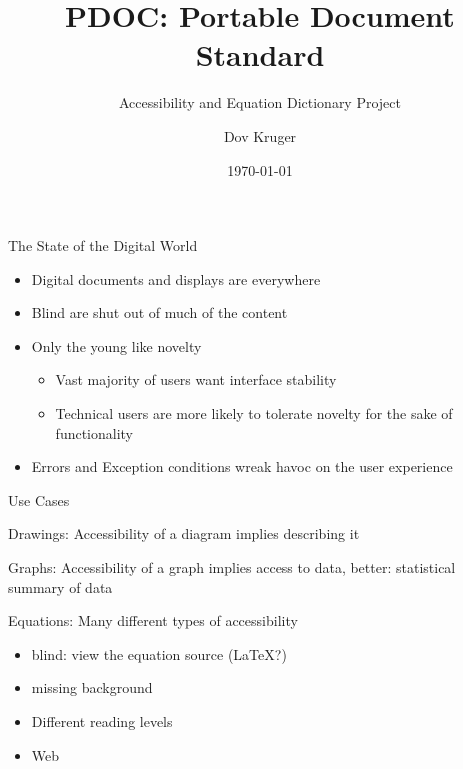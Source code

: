 \documentclass[aspectratio=169]{beamer}
\title{PDOC: Portable Document Standard}
\subtitle{Accessibility and Equation Dictionary Project}
\author{Dov Kruger}
\institute{Rutgers University}
\date{\today}
\begin{document}
\begin{frame}[fragile]
\titlepage
\end{frame}
\begin{frame}[fragile]{The State of the Digital World}
\begin{itemize}
\item Digital documents and displays are everywhere
\item Blind are shut out of much of the content
\item Only the young like novelty
\begin{itemize}
    \item Vast majority of users want interface stability
\item Technical users are more likely to tolerate novelty for the sake of functionality
\end{itemize}
\item Errors and Exception conditions wreak havoc on the user experience
\end{itemize}
\end{frame}

\begin{frame}[fragile]{Use Cases}
\item Drawings: Accessibility of a diagram implies describing it
\item Graphs: Accessibility of a graph implies access to data, better: statistical summary of data
\item Equations: Many different types of accessibility
  \begin{itemize}
    \item blind: view the equation source (LaTeX?)
    \item missing background
    \item Different reading levels
\item Web
\end{itemize}
\end{frame}
\end{document}
